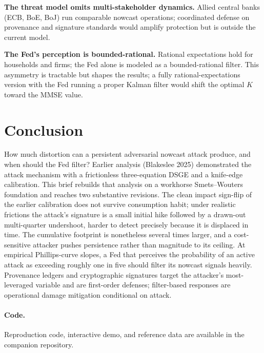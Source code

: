 \documentclass[12pt]{article}
\begin{document}
\textbf{The threat model omits multi-stakeholder dynamics.} Allied central banks (ECB, BoE, BoJ) run comparable nowcast operations; coordinated defense on provenance and signature standards would amplify protection but is outside the current model.

\textbf{The Fed's perception is bounded-rational.} Rational expectations hold for households and firms; the Fed alone is modeled as a bounded-rational filter. This asymmetry is tractable but shapes the results; a fully rational-expectations version with the Fed running a proper Kalman filter would shift the optimal \(K\) toward the MMSE value.

\section{Conclusion}

How much distortion can a persistent adversarial nowcast attack produce, and when should the Fed filter? Earlier analysis (Blakeslee 2025) demonstrated the attack mechanism with a frictionless three-equation DSGE and a knife-edge calibration. This brief rebuilds that analysis on a workhorse Smets--Wouters foundation and reaches two substantive revisions. The clean impact sign-flip of the earlier calibration does not survive consumption habit; under realistic frictions the attack's signature is a small initial hike followed by a drawn-out multi-quarter undershoot, harder to detect precisely because it is displaced in time. The cumulative footprint is nonetheless several times larger, and a cost-sensitive attacker pushes persistence rather than magnitude to its ceiling. At empirical Phillips-curve slopes, a Fed that perceives the probability of an active attack as exceeding roughly one in five should filter its nowcast signals heavily. Provenance ledgers and cryptographic signatures target the attacker's most-leveraged variable and are first-order defenses; filter-based responses are operational damage mitigation conditional on attack.

\paragraph{Code.} Reproduction code, interactive demo, and reference data are available in the companion repository.
\end{document}
